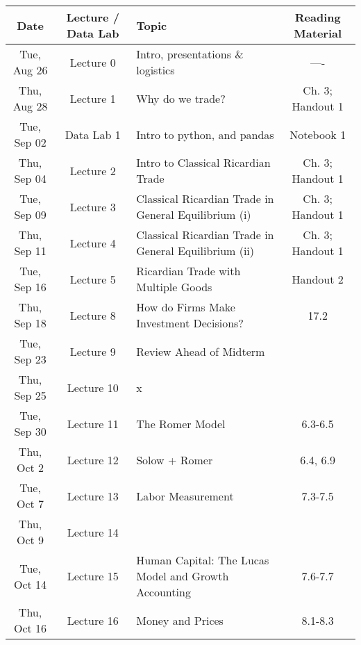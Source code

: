 \documentclass[11pt]{article}
\begin{document}
{\begin{center}
	\begin{tabular}{|c|c|l|c|}
		
		\hline \textbf{Date} & \textbf{Lecture / Data Lab} & \textbf{Topic} & \textbf{Reading Material} \\ \hline
			
		Tue, Aug 26 & Lecture 0 & Intro, presentations \& logistics & ---- \\ \hline
		Thu, Aug 28 & Lecture 1  & Why do we trade? & Ch. 3; Handout 1 \\ \hline
		Tue, Sep 02 & Data Lab 1 & Intro to python, and pandas & Notebook 1 \\ \hline
	    Thu, Sep 04 &Lecture 2 & Intro to Classical Ricardian Trade & Ch. 3; Handout 1 \\ \hline	
		Tue, Sep 09 & Lecture 3 & Classical Ricardian Trade in General Equilibrium (i) & Ch. 3; Handout 1 \\ \hline
		Thu, Sep 11 & Lecture 4 & Classical Ricardian Trade in General Equilibrium (ii) & Ch. 3; Handout 1 \\ \hline
		Tue, Sep 16 & Lecture 5 & Ricardian Trade with Multiple Goods & Handout 2 \\ \hline
		
		Thu, Sep 18 & Lecture 8 & How do Firms Make Investment Decisions? & 17.2 \\ \hline

		Tue, Sep 23 & Lecture 9 & Review Ahead of Midterm & \textemdash \\ \hline

  	Thu, Sep 25 &  Lecture 10 & x & \textemdash  \\ \hline

        Tue, Sep 30 & Lecture 11 & The Romer Model & 6.3-6.5 \\ \hline

        Thu, Oct 2 & Lecture 12 & Solow + Romer & 6.4, 6.9 \\ \hline

        Tue, Oct 7 & Lecture 13 & Labor Measurement &  7.3-7.5 \\ \hline

        Thu, Oct 9 & Lecture 14  &  \textbf{ } &   \\ \hline

        Tue, Oct 14 & Lecture 15 & Human Capital: The Lucas Model and Growth Accounting &7.6-7.7  \\ \hline
        Thu, Oct 16 & Lecture 16 & Money and Prices &8.1-8.3  \\ \hline
		

\end{tabular}
\end{center}}
\end{document}
